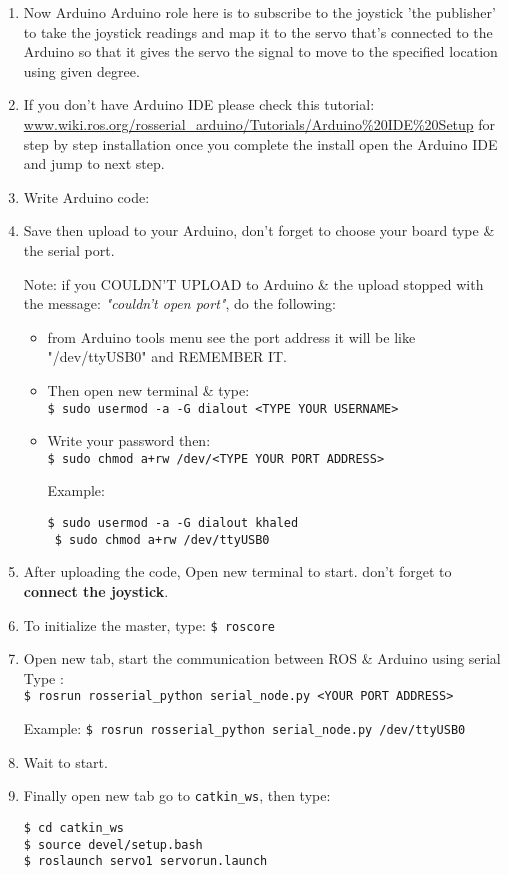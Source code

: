 \begin{enumerate}
     \item Now Arduino
 	Arduino role here is to subscribe to the joystick 'the publisher' to take the joystick readings and map it to the servo that's connected to the Arduino so that it gives the servo the signal to move to the specified location using given degree.
 	\item If you don't have Arduino IDE please check this tutorial: \url{www.wiki.ros.org/rosserial_arduino/Tutorials/Arduino%20IDE%20Setup}
 	for step by step installation once you complete the install open the Arduino IDE and jump to next step.
 	\item Write Arduino code:
 	\item Save then upload to your Arduino, don't forget to choose your board type \& the serial port.
 	
 	Note: if you COULDN'T UPLOAD to Arduino \& the upload stopped with the message: \emph{"couldn't open port"}, do the following:
     \begin{itemize}
         \item from Arduino tools menu see the port address it will be like "/dev/ttyUSB0" and REMEMBER IT.
         \item Then open new terminal \& type: \\
         \lstinline|$ sudo usermod -a -G dialout <TYPE YOUR USERNAME>|
         
         \item Write your password then:\\
         \lstinline|$ sudo chmod a+rw /dev/<TYPE YOUR PORT ADDRESS>|
         
         Example:
         \begin{lstlisting}[language=terCmd]
 $ sudo usermod -a -G dialout khaled
 $ sudo chmod a+rw /dev/ttyUSB0
         \end{lstlisting}
     \end{itemize}

     \item After uploading the code, Open new terminal to start. don't forget to \textbf{connect the joystick}.
 	
     \item To initialize the master, type: \lstinline|$ roscore|
 	\item Open new tab, start the communication between ROS \& Arduino using serial Type :\\
 	\lstinline|$ rosrun rosserial_python serial_node.py <YOUR PORT ADDRESS>| 

     Example: \lstinline|$ rosrun rosserial_python serial_node.py /dev/ttyUSB0|

    \item Wait to start.
     
 	\item Finally open new tab go to \verb|catkin_ws|, then type:
     \begin{lstlisting}[language=terCmd]
$ cd catkin_ws
$ source devel/setup.bash
$ roslaunch servo1 servorun.launch
     \end{lstlisting}
 \end{enumerate}